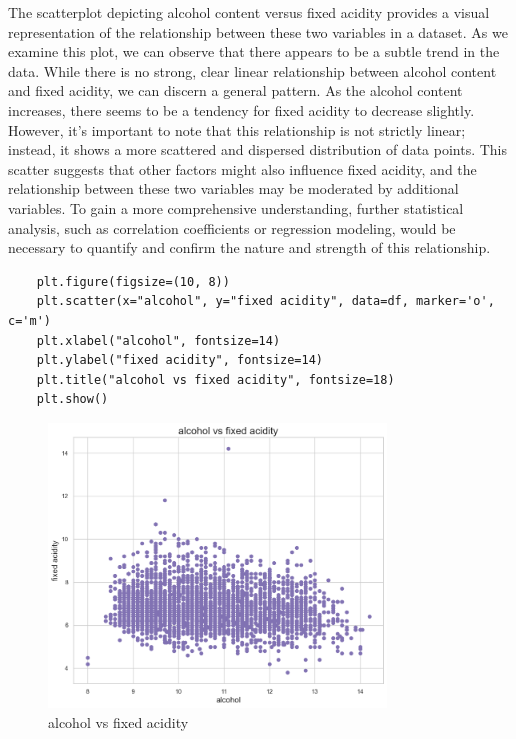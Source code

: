 \documentclass{report}
\begin{document}
The scatterplot depicting alcohol content versus fixed acidity provides a visual representation of the relationship between these two variables in a dataset. As we examine this plot, we can observe that there appears to be a subtle trend in the data. 
While there is no strong, clear linear relationship between alcohol content and fixed acidity, we can discern a general pattern. As the alcohol content increases, there seems to be a tendency for fixed acidity to decrease slightly. However, it's important to note that this relationship is not strictly linear; instead, 
it shows a more scattered and dispersed distribution of data points. This scatter suggests that other factors might also influence fixed acidity, and the relationship between these two variables may be moderated by additional variables. To gain a more comprehensive understanding, further statistical analysis, such as correlation coefficients or 
regression modeling, would be necessary to quantify and confirm the nature and strength of this relationship.\\

\begin{lstlisting}
    plt.figure(figsize=(10, 8))
    plt.scatter(x="alcohol", y="fixed acidity", data=df, marker='o', c='m')
    plt.xlabel("alcohol", fontsize=14)
    plt.ylabel("fixed acidity", fontsize=14)
    plt.title("alcohol vs fixed acidity", fontsize=18)
    plt.show()
\end{lstlisting}



\begin{figure}
    \centering
    \includegraphics[width=0.8\textwidth]{images/17.png}
    \caption{alcohol vs fixed acidity}
    \label{fig:alcohol vs fixed acidity}
\end{figure}
\end{document}
